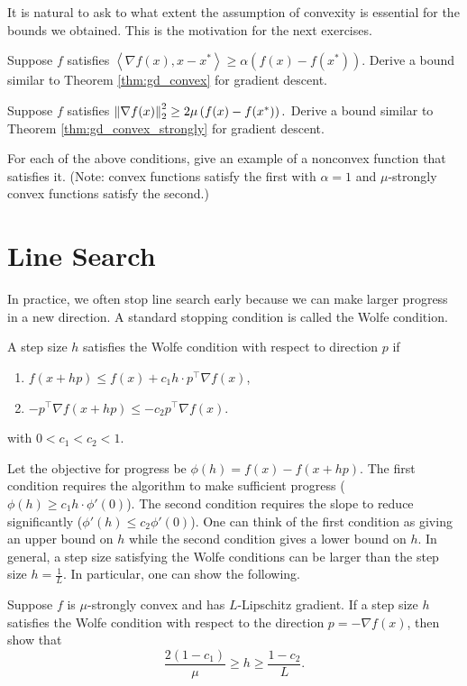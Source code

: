 It is natural to ask to what extent the assumption of convexity is
essential for the bounds we obtained. This is the motivation for the
next exercises.
\begin{xca}
Suppose $f$ satisfies $\left\langle \nabla f(x),x-x^{*}\right\rangle \ge\alpha\left(f(x)-f(x^{*})\right)$.
Derive a bound similar to Theorem \ref{thm:gd_convex} for gradient
descent.
\end{xca}

\begin{xca}
Suppose $f$ satisfies $\left\Vert \nabla f(x)\right\Vert^{2}_{2}\ge2\mu\left(f(x)-f(x^{*})\right).$
Derive a bound similar to Theorem \ref{thm:gd_convex_strongly} for
gradient descent.
\end{xca}

\begin{xca}
For each of the above conditions, give an example of a nonconvex function
that satisfies it. (Note: convex functions satisfy the first with
$\alpha=1$ and $\mu$-strongly convex functions satisfy the second.)
\end{xca}


\section{Line Search}

In practice, we often stop line search early because we can make larger
progress in a new direction. A standard stopping condition is called
the Wolfe condition.
\begin{defn}
A step size $h$ satisfies the Wolfe condition with respect to direction
$p$ if
\begin{enumerate}
\item $f(x+hp)\leq f(x)+c_{1}h\cdot p^{\top}\nabla f(x)$,
\item $-p^{\top}\nabla f(x+hp)\leq-c_{2}p^{\top}\nabla f(x)$.
\end{enumerate}
with $0<c_{1}<c_{2}<1$.
\end{defn}

Let the objective for progress be $\phi(h)=f(x)-f(x+hp)$. The first
condition requires the algorithm to make sufficient progress ($\phi(h)\geq c_{1}h\cdot\phi'(0)$).
The second condition requires the slope to reduce significantly ($\phi'(h)\leq c_{2}\phi'(0)$).
One can think of the first condition as giving an upper bound on $h$
while the second condition gives a lower bound on $h$. In general,
a step size satisfying the Wolfe conditions can be larger than the
step size $h=\frac{1}{L}$. In particular, one can show the following.
\begin{xca}
Suppose $f$ is $\mu$-strongly convex and has $L$-Lipschitz gradient.
If a step size $h$ satisfies the Wolfe condition with respect to
the direction $p=-\nabla f(x)$, then show that
\[
\frac{2(1-c_{1})}{\mu}\geq h\geq\frac{1-c_{2}}{L}.
\]
\end{xca}


